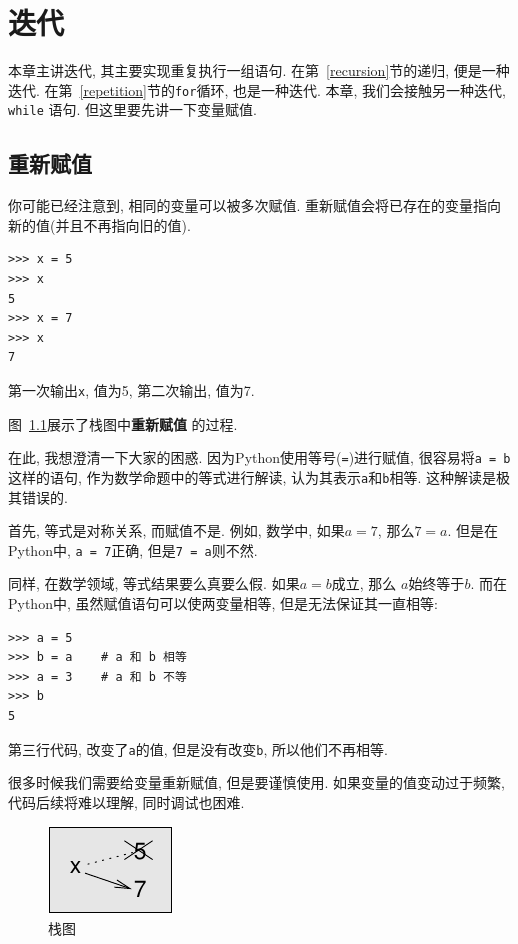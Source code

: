 \documentclass[10pt]{book}
\begin{document}
\chapter{迭代}

本章主讲迭代, 其主要实现重复执行一组语句. 
在第~\ref{recursion}节的递归, 便是一种迭代. 
在第~\ref{repetition}节的{\tt for}循环, 也是一种迭代. 
本章, 我们会接触另一种迭代, {\tt while} 语句. 
但这里要先讲一下变量赋值. 

\section{重新赋值}

你可能已经注意到, 相同的变量可以被多次赋值. 
重新赋值会将已存在的变量指向新的值(并且不再指向旧的值).

\begin{verbatim}
>>> x = 5
>>> x
5
>>> x = 7
>>> x
7
\end{verbatim}
%
第一次输出{\tt x}, 值为5, 第二次输出, 值为7.

图~\ref{fig.assign2}展示了栈图中{\bf 重新赋值}
的过程.  

在此, 我想澄清一下大家的困惑.
因为Python使用等号({\tt =})进行赋值, 
很容易将{\tt a = b}这样的语句, 作为数学命题中的等式进行解读, 
认为其表示{\tt a}和{\tt b}相等. 
这种解读是极其错误的. 

首先, 等式是对称关系, 而赋值不是. 
例如, 数学中, 如果$a=7$, 那么$7=a$. 但是在Python中, 
{\tt a = 7}正确, 但是{\tt 7 = a}则不然. 

同样, 在数学领域, 等式结果要么真要么假. 
如果$a=b$成立, 那么 $a$始终等于$b$. 
而在Python中, 虽然赋值语句可以使两变量相等, 但是无法保证其一直相等:

\begin{verbatim}
>>> a = 5
>>> b = a    # a 和 b 相等
>>> a = 3    # a 和 b 不等
>>> b
5
\end{verbatim}
%
第三行代码, 改变了{\tt a}的值, 但是没有改变{\tt b}, 所以他们不再相等. 

很多时候我们需要给变量重新赋值, 但是要谨慎使用. 
如果变量的值变动过于频繁, 代码后续将难以理解, 同时调试也困难. 

\begin{figure}
\centerline
{\includegraphics[scale=0.8]{figs/assign2.pdf}}
\caption{栈图}
\label{fig.assign2}
\end{figure}
\end{document}
